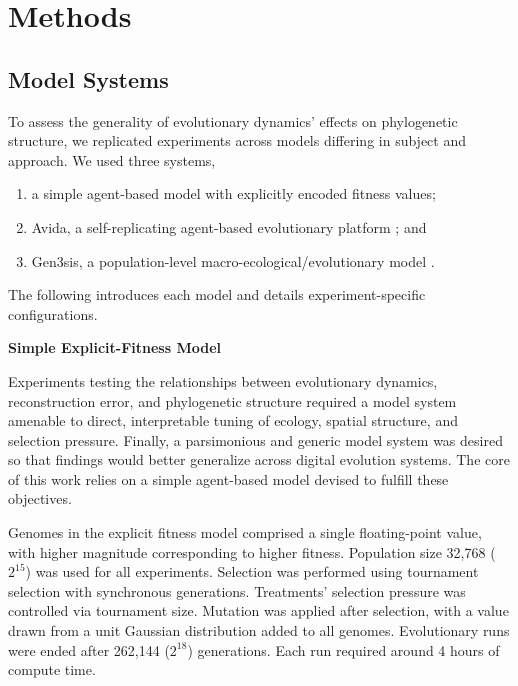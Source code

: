 \section{Methods}
\label{sec:methods}

\subsection{Model Systems}

To assess the generality of evolutionary dynamics' effects on phylogenetic structure, we replicated experiments across models differing in subject and approach.
We used three systems,
\begin{enumerate}
\item a simple agent-based model with explicitly encoded fitness values;
\item Avida, a self-replicating agent-based evolutionary platform \citep{ofria2004avida}; and
\item Gen3sis, a population-level macro-ecological/evolutionary model \citep{hagen2021gen3sis}.
\end{enumerate}

The following introduces each model and details experiment-specific configurations.

\textbf{Simple Explicit-Fitness Model}


Experiments testing the relationships between evolutionary dynamics, reconstruction error, and phylogenetic structure required a model system amenable to direct, interpretable tuning of ecology, spatial structure, and selection pressure.
Finally, a parsimonious and generic model system was desired so that findings would better generalize across digital evolution systems.
The core of this work relies on a simple agent-based model devised to fulfill these objectives.

Genomes in the explicit fitness model comprised a single floating-point value, with higher magnitude corresponding to higher fitness.
Population size 32,768 ($2^{15}$) was used for all experiments.
Selection was performed using tournament selection with synchronous generations.
Treatments' selection pressure was controlled via tournament size.
Mutation was applied after selection, with a value drawn from a unit Gaussian distribution added to all genomes.
Evolutionary runs were ended after 262,144 ($2^{18}$) generations.
Each run required around 4 hours of compute time.

